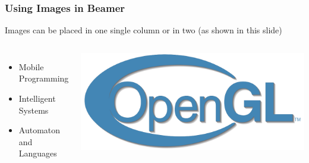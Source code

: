 \documentclass[aspectratio=169]{beamer}
\begin{document}
\begin{frame}[fragile]
\frametitle{Using Images in Beamer}
Images can be placed in one single column or in two (as shown in this slide)
\begin{columns}

\begin{itemize}
\item Mobile Programming 
\item Intelligent Systems
\item Automaton and Languages
\end{itemize}
\begin{center}
\includegraphics[width=0.98\linewidth]{graphics/Opengl-logo.png}    
\end{center}


\end{columns}
\end{frame}
\end{document}

